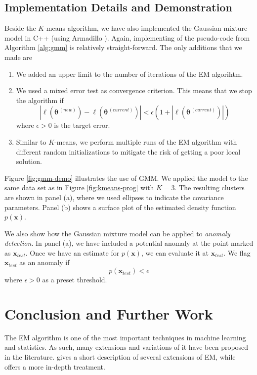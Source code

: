 \documentclass[final,3p,times,twocolumn]{elsarticle}
\let\bs\boldsymbol
\begin{document}
\subsection{Implementation Details and Demonstration}

Beside the $K$-means algorithm, we have also implemented the Gaussian mixture model in C++ (using Armadillo \cite{armadillo}).
Again, implementing of the pseudo-code from Algorithm \ref{alg:gmm} is relatively straight-forward.
The only additions that we made are
\begin{enumerate}
\item We added an upper limit to the number of iterations of the EM algorihtm.
\item We used a mixed error test as convergence criterion.
This means that we stop the algorithm if
\begin{equation}
|\ell(\bs\theta^{\,(new)}) - \ell(\bs\theta^{\,(current)})| < \epsilon \left(1 + |\ell(\bs\theta^{\,(current)})|\right)
\end{equation}
where $\epsilon > 0$ is the target error.
\item Similar to $K$-means, we perform multiple runs of the EM algorithm with different random initializations to mitigate the risk of getting a poor local solution.
\end{enumerate}

Figure \ref{fig:gmm-demo} illustrates the use of GMM.
We applied the model to the same data set as in Figure \ref{fig:kmeans-prog} with $K=3$.
The resulting clusters are shown in panel (a), where we used ellipses to indicate the covariance parameters.
Panel (b) shows a surface plot of the estimated density function $p(\bs x)$.

We also show how the Gaussian mixture model can be applied to \emph{anomaly detection}.
In panel (a), we have included a potential anomaly at the point marked as $\bs x_{test}$.
Once we have an estimate for $p(\bs x)$, we can evaluate it at $\bs x_{test}$.
We flag $\bs x_{test}$ as an anomaly if 
\begin{equation*}
p(\bs x_{test}) < \epsilon
\end{equation*}
where $\epsilon > 0$ as a preset threshold.



\section{Conclusion and Further Work}
\label{sect:concl}
The EM algorithm is one of the most important techniques in machine learning and statistics.
As such, many extensions and variations of it have been proposed in the literature.
\cite{Murphy} gives a short description of several extensions of EM, while \cite{mclachlan1997} offers a more in-depth treatment.
\end{document}
